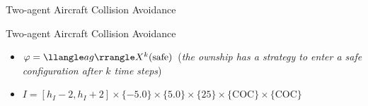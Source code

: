 \documentclass[10pt]{beamer}
\newcommand\blfootnote[1]{%
  \begingroup
  \renewcommand\thefootnote{}\footnote{#1}%
  \addtocounter{footnote}{-1}%
  \endgroup
}
\begin{document}
\begin{frame}{Two-agent Aircraft Collision Avoidance}
    \begin{figure}
    \end{figure}


\end{frame}


\begin{frame}{Two-agent Aircraft Collision Avoidance}

  \begin{itemize}\itemsep 1em
  \item %
    $ \varphi = \egamma[ag]{k} (\text{safe})$ \quad ({\it the ownship has a strategy to enter a safe
    configuration after $k$ time steps})    
  \item  $I = [h_I-2, h_I+2] \times \{-5.0\} \times \{5.0\} \times \{25\} \times \{\text{COC}\} \times \{\text{COC}\}$
  \end{itemize}

    \begin{figure}
    \end{figure}
 

\end{frame}
\end{document}
